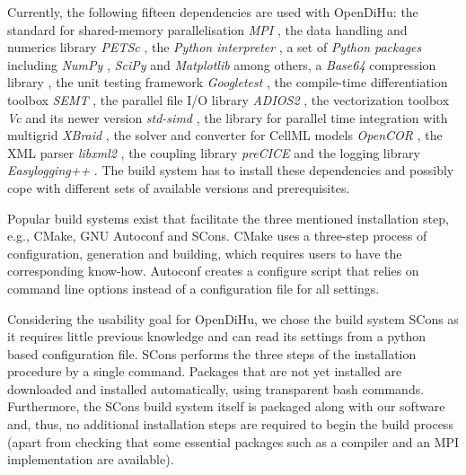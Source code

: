 Currently, the following fifteen dependencies are used with OpenDiHu: the standard for shared-memory parallelisation \emph{MPI} \cite{openmpi}, the data handling and numerics library \emph{PETSc} \cite{petsc-efficient1997,petsc-user-ref,petsc-web-page}, the \emph{Python interpreter} \cite{python3}, a set of \emph{Python packages} including \emph{NumPy} \cite{numpy}, \emph{SciPy} \cite{scipy} and \emph{Matplotlib} \cite{matplotlib} among others, a \emph{Base64} compression library \cite{base64}, the unit testing framework \emph{Googletest} \cite{googletest}, the compile-time differentiation toolbox \emph{SEMT} \cite{gutterman2004symbolic,semt}, the parallel file I/O library \emph{ADIOS2} \cite{adios2}, the vectorization toolbox \emph{Vc} \cite{vc2012,Kretz2015} and its newer version \emph{std-simd} \cite{hoberock2016working}, the library for parallel time integration with multigrid \emph{XBraid} \cite{xbraid-package}, the solver and converter for CellML models \emph{OpenCOR} \cite{OpenCOR2015}, the XML parser \emph{libxml2} \cite{libxml2}, the coupling library \emph{preCICE} \cite{precice} and the logging library \emph{Easylogging++} \cite{easyloggingpp}. The build system has to install these dependencies and possibly cope with different sets of available versions and prerequisites.


Popular build systems exist that facilitate the three mentioned installation step, e.g., CMake, GNU Autoconf and SCons. CMake uses a three-step process of configuration, generation and building, which requires users to have the corresponding know-how. Autoconf creates a configure script that relies on command line options instead of a configuration file for all settings. 

Considering the usability goal for OpenDiHu, we chose the build system SCons as it requires little previous knowledge and can read its settings from a python based configuration file. SCons performs the three steps of the installation procedure by a single command. Packages that are not yet installed are downloaded and installed automatically, using transparent bash commands.
Furthermore, the SCons build system itself is packaged along with our software and, thus, no additional installation steps are required to begin the build process (apart from checking that some essential packages such as a compiler and an MPI implementation are available).

